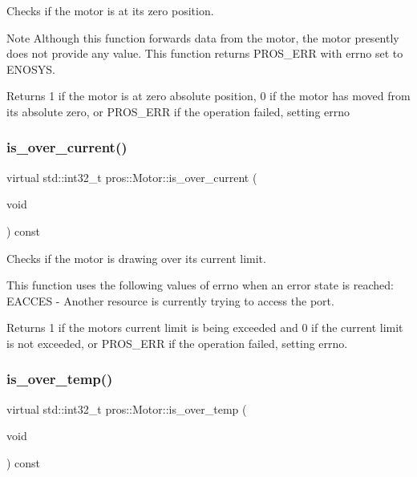 Checks if the motor is at its zero position. 

\begin{DoxyNote}{Note}
Although this function forwards data from the motor, the motor presently does not provide any value. This function returns P\+R\+O\+S\+\_\+\+E\+RR with errno set to E\+N\+O\+S\+YS.
\end{DoxyNote}
\begin{DoxyReturn}{Returns}
1 if the motor is at zero absolute position, 0 if the motor has moved from its absolute zero, or P\+R\+O\+S\+\_\+\+E\+RR if the operation failed, setting errno 
\end{DoxyReturn}
\mbox{\label{classpros_1_1Motor_a2d34c92effccfbb4d2f45319bf4bd272}} 
\subsubsection{\texorpdfstring{is\_over\_current()}{is\_over\_current()}}
{\footnotesize\ttfamily virtual std\+::int32\+\_\+t pros\+::\+Motor\+::is\+\_\+over\+\_\+current (\begin{DoxyParamCaption}\item[{void}]{ }\end{DoxyParamCaption}) const\hspace{0.3cm}{\ttfamily [virtual]}}



Checks if the motor is drawing over its current limit. 

This function uses the following values of errno when an error state is reached\+: E\+A\+C\+C\+ES -\/ Another resource is currently trying to access the port.

\begin{DoxyReturn}{Returns}
1 if the motor\textquotesingle{}s current limit is being exceeded and 0 if the current limit is not exceeded, or P\+R\+O\+S\+\_\+\+E\+RR if the operation failed, setting errno. 
\end{DoxyReturn}
\mbox{\label{classpros_1_1Motor_a099d50ed35d73fa29a46b2beb151ce2b}} 
\subsubsection{\texorpdfstring{is\_over\_temp()}{is\_over\_temp()}}
{\footnotesize\ttfamily virtual std\+::int32\+\_\+t pros\+::\+Motor\+::is\+\_\+over\+\_\+temp (\begin{DoxyParamCaption}\item[{void}]{ }\end{DoxyParamCaption}) const\hspace{0.3cm}{\ttfamily [virtual]}}



